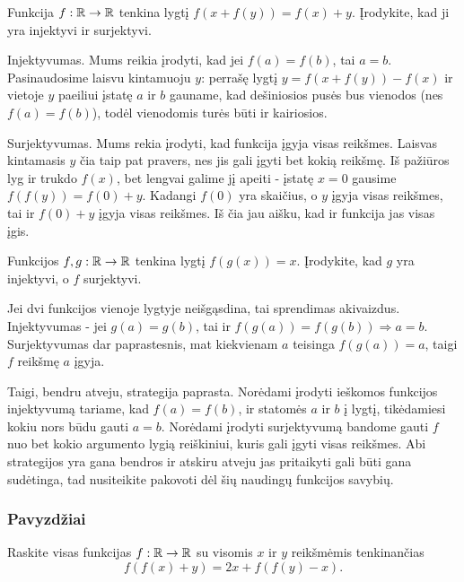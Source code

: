 \begin{pav}
Funkcija $f:\mathbb R \to \mathbb R$ tenkina lygtį $f(x +f(y)) = f(x) + y$. Įrodykite,
kad ji yra injektyvi ir surjektyvi.
\end{pav}

Injektyvumas. Mums reikia įrodyti, kad jei $f(a)=f(b)$, tai $a=b$.
Pasinaudosime laisvu kintamuoju $y$: perrašę lygtį $y=f(x+f(y))-f(x)$
ir vietoje $y$ paeiliui įstatę $a$ ir $b$ gauname, kad dešiniosios pusės
bus vienodos (nes $f(a)=f(b)$), todėl vienodomis turės būti ir kairiosios.

Surjektyvumas. Mums rekia įrodyti, kad funkcija įgyja visas reikšmes.
Laisvas kintamasis $y$ čia taip pat pravers, nes jis gali įgyti bet kokią
reikšmę. Iš pažiūros lyg ir trukdo $f(x)$, bet lengvai galime jį apeiti -
įstatę $x=0$ gausime $f(f(y))=f(0) + y$. Kadangi $f(0)$ yra skaičius, o $y$
įgyja visas reikšmes, tai ir $f(0)+y$ įgyja visas reikšmes. Iš čia jau
aišku, kad ir funkcija jas visas įgis.

\begin{pav}
Funkcijos $f,g:\mathbb R \to \mathbb R$ tenkina lygtį $f(g(x)) = x$. Įrodykite, kad $g$ yra injektyvi, o $f$ surjektyvi.
\end{pav}

Jei dvi funkcijos vienoje lygtyje neišgąsdina, tai sprendimas akivaizdus.
Injektyvumas - jei $g(a)=g(b)$, tai ir $f(g(a))=f(g(b)) \Rightarrow a=b$. Surjektyvumas
dar paprastesnis, mat kiekvienam $a$ teisinga $f(g(a))=a$, taigi $f$
reikšmę $a$ įgyja.

Taigi, bendru atveju, strategija paprasta. Norėdami įrodyti ieškomos
funkcijos injektyvumą tariame, kad $f(a)=f(b)$, ir statomės $a$ ir $b$ į
lygtį, tikėdamiesi kokiu nors būdu gauti $a=b$. Norėdami įrodyti
surjektyvumą bandome gauti $f$ nuo bet kokio argumento lygią reiškiniui,
kuris gali įgyti visas reikšmes. Abi strategijos yra gana bendros ir
atskiru atveju jas pritaikyti gali būti gana sudėtinga, tad nusiteikite
pakovoti dėl šių naudingų funkcijos savybių.


\subsubsection{Pavyzdžiai}

\begin{pavnr} Raskite visas funkcijas $f:\mathbb R \to \mathbb R$ su visomis $x$ ir $y$
  reikšmėmis tenkinančias $$f(f(x)+y) = 2x +f(f(y)-x).$$
\end{pavnr}

